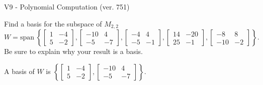 \begin{exercise}
  \begin{exerciseTitle}V9 - Polynomial Computation (ver. 751)\end{exerciseTitle}
  \begin{exerciseStatement}
    Find a basis for the subspace of \(M_{2,2}\) 
\[W=\mathrm{span}\ \left\{\left[\begin{array}{cc}
1 & -4 \\
5 & -2
\end{array}\right] , \left[\begin{array}{cc}
-10 & 4 \\
-5 & -7
\end{array}\right] , \left[\begin{array}{cc}
-4 & 4 \\
-5 & -1
\end{array}\right] , \left[\begin{array}{cc}
14 & -20 \\
25 & -1
\end{array}\right] , \left[\begin{array}{cc}
-8 & 8 \\
-10 & -2
\end{array}\right]\right\}.\]
 Be sure to explain why your result is a basis.


  \end{exerciseStatement}
  \begin{exerciseAnswer}
   A basis of \(W\) is  \(\left\{\left[\begin{array}{cc}
1 & -4 \\
5 & -2
\end{array}\right] , \left[\begin{array}{cc}
-10 & 4 \\
-5 & -7
\end{array}\right]\right\}\).
  


  \end{exerciseAnswer}
\end{exercise}